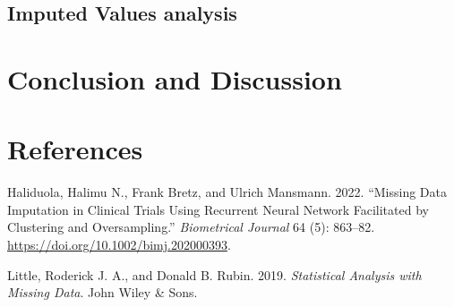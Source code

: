 \documentclass[
]{article}
\newlength{\cslhangindent}
\newenvironment{CSLReferences}[2] %
 {\begin{list}{}{%
  \setlength{\itemindent}{0pt}
  \setlength{\leftmargin}{0pt}
  \setlength{\parsep}{0pt}
  \ifodd #1
   \setlength{\leftmargin}{\cslhangindent}
   \setlength{\itemindent}{-1\cslhangindent}
  \fi
  \setlength{\itemsep}{#2\baselineskip}}}
 {\end{list}}
\begin{document}
\subsection{Imputed Values analysis}\label{imputed-values-analysis}

\section{Conclusion and Discussion}\label{conclusion-and-discussion}

\newpage

\section{References}\label{references}

\label{refs}
\begin{CSLReferences}{1}{0}
Haliduola, Halimu N., Frank Bretz, and Ulrich Mansmann. 2022. {``Missing
Data Imputation in Clinical Trials Using Recurrent Neural Network
Facilitated by Clustering and Oversampling.''} \emph{Biometrical
Journal} 64 (5): 863--82. \url{https://doi.org/10.1002/bimj.202000393}.

Little, Roderick J. A., and Donald B. Rubin. 2019. \emph{Statistical
Analysis with Missing Data}. John Wiley \& Sons.

\end{CSLReferences}
\end{document}

